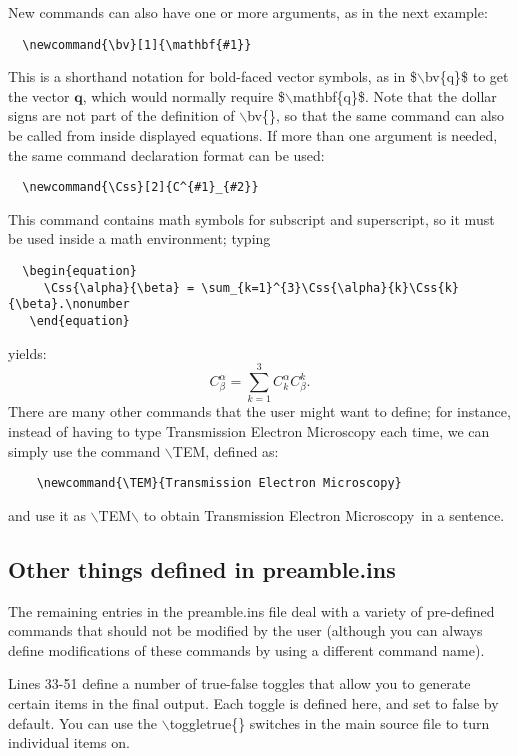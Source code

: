 \documentclass[DIV=calc, paper=letter, fontsize=11pt]{scrartcl}	 %
\newcommand{\la}[2]{\textsf{$\backslash$#1}\{#2\}}
\newcommand{\lb}[1]{\textsf{$\backslash$#1}}
\newcommand{\bv}[1]{\mathbf{#1}}
\newcommand{\Css}[2]{C^{#1}_{#2}}
\newcommand{\TEM}{Transmission Electron Microscopy}
\begin{document}
New commands can also have one or more arguments, as in the next example:
\begin{verbatim}
  \newcommand{\bv}[1]{\mathbf{#1}}	
\end{verbatim}
This is a shorthand notation for bold-faced vector symbols, as in \$\la{bv}{q}\$ to get the vector $\bv{q}$, which would
normally require \$\la{mathbf}{q}\$. Note that the dollar signs
are not part of the definition of \la{bv}{}, so that the same command can also be called from inside displayed equations.
If more than one argument is needed, the same command declaration format can be used:
\begin{verbatim}
  \newcommand{\Css}[2]{C^{#1}_{#2}}	
\end{verbatim}
This command contains math symbols for subscript and superscript, so it must be used inside a math environment;
typing 
\begin{verbatim}
  \begin{equation}
     \Css{\alpha}{\beta} = \sum_{k=1}^{3}\Css{\alpha}{k}\Css{k}{\beta}.\nonumber
   \end{equation}
\end{verbatim}
yields:
\begin{equation}
     \Css{\alpha}{\beta} = \sum_{k=1}^{3}\Css{\alpha}{k}\Css{k}{\beta}.\nonumber
\end{equation}
There are many other commands that the user might want to define; for instance, instead of having to type Transmission Electron Microscopy each time,
we can simply use the command \lb{TEM}, defined as:
\begin{verbatim}
	\newcommand{\TEM}{Transmission Electron Microscopy}
\end{verbatim}
and use it as \lb{TEM}$\backslash$ to obtain \TEM\ in a sentence.  


\subsection{Other things defined in \textsf{preamble.ins}\label{sec:figures}}
The remaining entries in the \textsf{preamble.ins} file deal with a variety of pre-defined commands that should not
be modified by the user (although you can always define modifications of these commands by using a different command name).

Lines 33-51 define a number of true-false toggles that allow you to generate certain items in the final output.  Each toggle is 
defined here, and set to false by default.  You can use the \la{toggletrue}{} switches in the main source file to turn individual 
items on.
\end{document}
